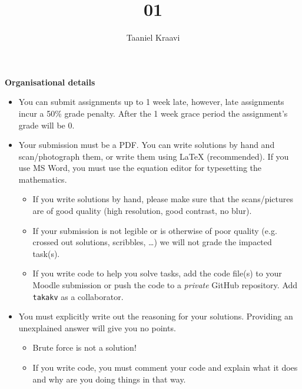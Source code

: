 \documentclass{homework}
\title{01}
\author{Taaniel Kraavi}
\date{\DTMdate{2024-10-18}}
\begin{document}
\maketitle

\textbf{Organisational details}
\begin{itemize}
  \item You can submit assignments up to 1 week late, however, late assignments incur a 50\% grade penalty.
  After the 1 week grace period the assignment's grade will be 0.
  \item Your submission must be a PDF.
  You can write solutions by hand and scan/photograph them, or write them using \LaTeX{} (recommended).
  If you use MS Word, you must use the equation editor for typesetting the mathematics.
  \begin{itemize}
    \item If you write solutions by hand, please make sure that the scans/pictures are of good quality (high resolution, good contrast, no blur).
    \item If your submission is not legible or is otherwise of poor quality (e.g. crossed out solutions, scribbles, \dots) we will not grade the impacted task(s).
    \item If you write code to help you solve tasks, add the code file(s) to your Moodle submission or push the code to a \emph{private} GitHub repository.
    Add \texttt{takakv} as a collaborator.
  \end{itemize}
  \item You must explicitly write out the reasoning for your solutions.
  Providing an unexplained answer will give you no points.
  \begin{itemize}
    \item Brute force is not a solution!
    \item If you write code, you must comment your code and explain what it does and why are you doing things in that way.
  \end{itemize}
\end{itemize}

\vspace*{1em}
\end{document}
